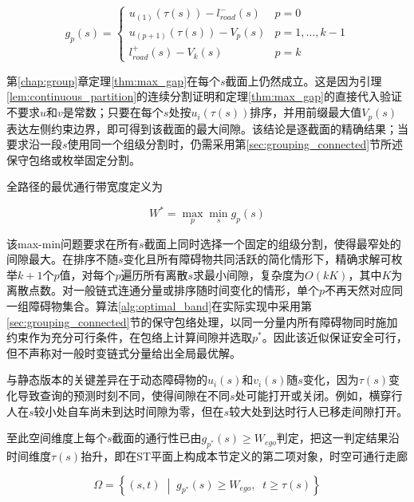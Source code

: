 \begin{equation}
    g_p(s) = \begin{cases}
        u_{(1)}(\tau(s)) - l_{road}^{-}(s) & p = 0 \\[0.3em]
        u_{(p+1)}(\tau(s)) - V_p(s) & p = 1, \ldots, k-1 \\[0.3em]
        l_{road}^{+}(s) - V_k(s) & p = k
    \end{cases}
    \label{eq:time_varying_gap}
\end{equation}

第\ref{chap:group}章定理\ref{thm:max_gap}在每个$s$截面上仍然成立。这是因为引理\ref{lem:continuous_partition}的连续分割证明和定理\ref{thm:max_gap}的直接代入验证不要求$u$和$v$是常数；只要在每个$s$处按$u_i(\tau(s))$排序，并用前缀最大值$V_p(s)$表达左侧约束边界，即可得到该截面的最大间隙。该结论是逐截面的精确结果；当要求沿一段$s$使用同一个组级分割时，仍需采用第\ref{sec:grouping_connected}节所述保守包络或枚举固定分割。

全路径的最优通行带宽度定义为

\begin{equation}
    W^{*} = \max_{p} \min_{s} g_p(s)
    \label{eq:time_varying_opt}
\end{equation}

该max-min问题要求在所有$s$截面上同时选择一个固定的组级分割，使得最窄处的间隙最大。在排序不随$s$变化且所有障碍物共同活跃的简化情形下，精确求解可枚举$k+1$个$p$值，对每个$p$遍历所有离散$s$求最小间隙，复杂度为$O(kK)$，其中$K$为离散点数。对一般链式连通分量或排序随时间变化的情形，单个$p$不再天然对应同一组障碍物集合。算法\ref{alg:optimal_band}在实际实现中采用第\ref{sec:grouping_connected}节的保守包络处理，以同一分量内所有障碍物同时施加约束作为充分可行条件，在包络上计算间隙并选取$p^{*}$。因此该近似保证安全可行，但不声称对一般时变链式分量给出全局最优解。

与静态版本的关键差异在于动态障碍物的$u_i(s)$和$v_i(s)$随$s$变化，因为$\tau(s)$变化导致查询的预测时刻不同，使得间隙在不同$s$处可能打开或关闭。例如，横穿行人在$s$较小处自车尚未到达时间隙为零，但在$s$较大处到达时行人已移走间隙打开。

至此空间维度上每个$s$截面的通行性已由$g_{p^*}(s) \geq W_{ego}$判定，把这一判定结果沿时间维度$\tau(s)$抬升，即在ST平面上构成本节定义的第二项对象，时空可通行走廊

\begin{equation}
    \Omega = \left\{(s, t) \;\middle|\; g_{p^*}(s) \geq W_{ego},\;\; t \geq \tau(s) \right\}
    \label{eq:st_corridor}
\end{equation}

